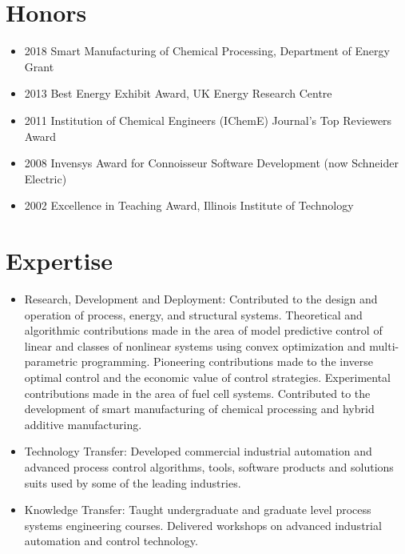 \documentclass[10pt]{article}
\begin{document}
\section{Honors}
\begin{itemize}[itemsep=-1mm]
\item 2018 \;\; Smart Manufacturing of Chemical Processing, Department of Energy Grant
\item 2013 \;\; Best Energy Exhibit Award, UK Energy Research Centre
\item 2011 \;\; Institution of Chemical Engineers (IChemE) Journal's Top Reviewers Award
\item 2008 \;\; Invensys Award for Connoisseur{\texttrademark} Software Development (now Schneider Electric) %
\item 2002 \;\; Excellence in Teaching Award, Illinois Institute of Technology
\end{itemize}

\section{Expertise}
\begin{itemize}
\item Research, Development and Deployment: Contributed to the design and operation of process, energy, and structural systems. Theoretical and algorithmic contributions made in the area of model predictive control of linear and classes of nonlinear systems using convex optimization and multi-parametric programming. Pioneering contributions made to the inverse optimal control and the economic value of control strategies. Experimental contributions made in the area of fuel cell systems. Contributed to the development of smart manufacturing of chemical processing and hybrid additive manufacturing.
\item Technology Transfer: Developed commercial industrial automation and advanced process control algorithms, tools, software products and solutions suits used by some of the leading industries.
\item Knowledge Transfer: Taught undergraduate and graduate level process systems engineering courses. Delivered workshops on advanced industrial automation and control technology.%
\end{itemize}
\end{document}
